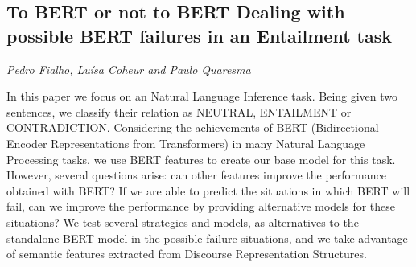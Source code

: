 \documentclass[../booklet.tex]{subfiles}
\begin{document}
\subsection[To BERT or not to BERT Dealing with possible BERT failures in an Entailment task. {\it Pedro Fialho, Luísa Coheur and Paulo Quaresma}]{To BERT or not to BERT Dealing with possible BERT failures in an Entailment task}
  

\begin{center}
  {\it Pedro Fialho, Luísa Coheur and Paulo Quaresma}
\end{center}

\vskip 0.8cm


In this paper we focus on an Natural Language Inference task. Being given two sentences, we classify their relation as NEUTRAL, ENTAILMENT or CONTRADICTION. Considering the achievements of BERT (Bidirectional Encoder Representations from Transformers) in many Natural Language Processing tasks, we use BERT features to create our base model for this task. However, several questions arise: can other features improve the performance obtained with BERT? If we are able to predict the situations in which BERT will fail, can we improve the performance by providing alternative models for these situations? We test several strategies and models, as alternatives to the standalone BERT model in the possible failure situations, and we take advantage of semantic features extracted from Discourse Representation Structures.

\end{document}
